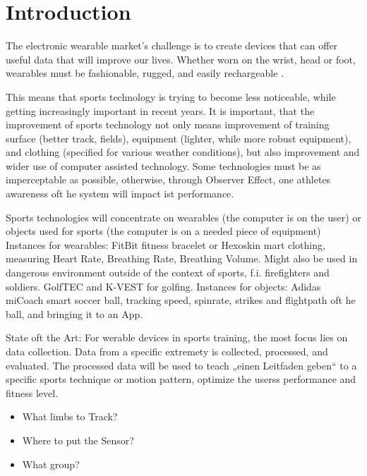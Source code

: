 \documentclass[sigconf]{acmart}
\begin{document}
	\maketitle
	
	\section{Introduction}
		\par The electronic wearable market’s challenge is to create devices that can offer useful data that will improve our lives. Whether worn on the wrist, head or foot, wearables must be fashionable, rugged, and easily rechargeable \cite{TE}.   
		\par 
		This means that sports technology is trying to become less noticeable,  while getting increasingly important in recent years. It is important, that the improvement of sports technology not only means improvement of training surface (better track, fields), equipment (lighter, while more robust equipment), and clothing (specified for various weather conditions), but also improvement and wider use of computer assisted technology.
		Some technologies must be as imperceptable as possible, otherwise, through Observer Effect, one athletes awareness oft he system will impact ist performance.
		\par 
		Sports technologies will concentrate on wearables (the computer is on the user) or objects used for sports (the computer is on a needed piece of equipment)
		Instances for wearables: FitBit fitness bracelet or Hexoskin mart clothing, measuring Heart Rate, Breathing Rate, Breathing Volume. Might also be used in dangerous environment outside of the context of sports, f.i. firefighters and soldiers. GolfTEC and K-VEST for golfing.
		Instances for objects: Adidas miCoach smart soccer ball, tracking speed, spinrate, strikes and flightpath oft he ball, and bringing it to an App.
		
		State oft the Art:
		For werable devices in sports training, the most focus lies on data collection. Data from a specific extremety is collected, processed, and evaluated. The processed data will be used to teach „einen Leitfaden geben“ to a specific sports technique or motion pattern, optimize the userss performance and fitness level.
		\begin{itemize}
			\item What limbs to Track? 
			\item Where to put the Sensor?
			\item What group?
		\end{itemize}
			
\end{document}
